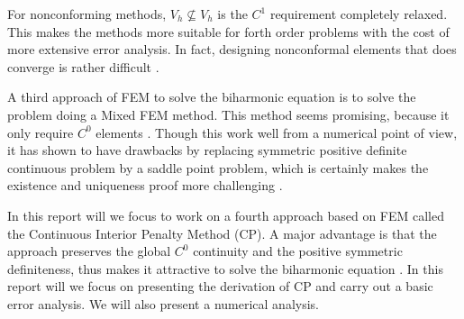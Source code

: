 For nonconforming methods, $V_{h} \not \subseteq  V_{h}$ is the $C^{1}$ requirement completely relaxed. This makes the methods more suitable for forth order problems with the cost of more extensive error analysis. In fact, designing nonconformal
elements that does converge is rather difficult \cite{shi02, nair21}.

A third approach of FEM to solve the biharmonic equation is to solve the problem doing a Mixed FEM method. This method seems promising, because it only require $C^{0}$ elements \cite{chen08, brezzi91}.
Though this work well from a numerical point of view, it has shown to have drawbacks by replacing symmetric positive definite continuous problem
by a saddle point problem, which is certainly makes the existence and uniqueness proof more challenging \cite{brezzi74}.

In this report will we focus to work on a fourth approach based on FEM called the Continuous Interior Penalty Method (CP). A major advantage is that the approach preserves the global $C^{0}$ continuity and the positive symmetric definiteness, thus
makes it attractive to solve the biharmonic equation \cite{brenner2012, brenner2012quadratic}. In this report will we focus on presenting the derivation of CP and carry out a basic error analysis. We will also present a numerical analysis.

